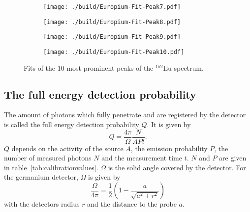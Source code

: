 \begin{figure}[H]
	\begin{adjustbox}{width=1.3\textwidth, center}
		\begin{subfigure}{.5\textwidth}
			\centering
			\texttt{[image: ./build/Europium-Fit-Peak7.pdf]}
		\end{subfigure}%
		\begin{subfigure}{.5\textwidth}
			\centering
			\texttt{[image: ./build/Europium-Fit-Peak8.pdf]}
		\end{subfigure}
	\end{adjustbox}
	\begin{adjustbox}{width=1.3\textwidth, center}
		\begin{subfigure}{.5\textwidth}
			\centering
			\texttt{[image: ./build/Europium-Fit-Peak9.pdf]}
		\end{subfigure}%
		\begin{subfigure}{.5\textwidth}
			\centering
			\texttt{[image: ./build/Europium-Fit-Peak10.pdf]}
		\end{subfigure}
	\end{adjustbox}
	\caption{Fits of the 10 most prominent peaks of the $^{152}\text{Eu}$ spectrum.}
\end{figure}
\FloatBarrier


\subsection{The full energy detection probability}
\label{sec:fullenergy}
The amount of photons which fully penetrate and are registered by the detector is called the full energy
detection probability $Q$. It is given by
\begin{equation}
	Q = \frac{4 \pi}{\Omega}\frac{N}{APt}.
	\label{eqn:fullenergy}
\end{equation}
$Q$ depends on the activity of the source $A$, the emission probability $P$, the number of measured photons $N$ and
the measurement time $t$. $N$ and $P$ are given in
table~\ref{tab:calibrationvalues}. $\Omega$ is the solid angle covered by the
detector. For the germanium detector, $\Omega$ is given by
\begin{equation}
	\frac{\Omega}{4 \pi} = \frac{1}{2} \left( 1 - \frac{a}{\sqrt{a^{2} + r^{2}}} \right)
	\label{eqn:solidangle}
\end{equation}
with the detectors radius $r$ and the distance to the probe $a$.

